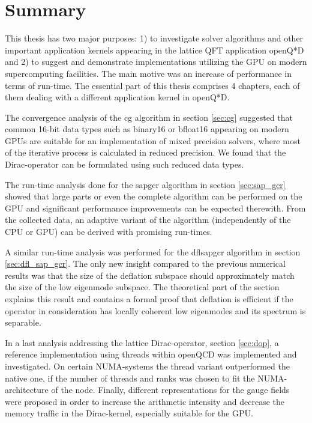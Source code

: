 \documentclass{article}
\theoremstyle{plain} %
\theoremstyle{convention} %
\theoremstyle{remark} %
\numberwithin{equation}{section}
\begin{document}
\section{Summary}

\label{sec:summary}

This thesis has two major purposes: 1) to investigate solver algorithms and other important application kernels appearing in the lattice QFT application openQ*D and 2) to suggest and demonstrate implementations utilizing the GPU on modern supercomputing facilities. The main motive was an increase of performance in terms of run-time. The essential part of this thesis comprises \num{4} chapters, each of them dealing with a different application kernel in openQ*D.

The convergence analysis of the \acrshort{cg} algorithm in section \ref{sec:cg} suggested that common \num{16}-bit data types such as \gls{binary16} or \gls{bfloat16} appearing on modern GPUs are suitable for an implementation of mixed precision solvers, where most of the iterative process is calculated in reduced precision. We found that the Dirac-operator can be formulated using such reduced data types.

The run-time analysis done for the \acrshort{sapgcr} algorithm in section \ref{sec:sap_gcr} showed that large parts or even the complete algorithm can be performed on the GPU and significant performance improvements can be expected therewith. From the collected data, an adaptive variant of the algorithm (independently of the CPU or GPU) can be derived with promising run-times.

A similar run-time analysis was performed for the \acrshort{dflsapgcr} algorithm in section \ref{sec:dfl_sap_gcr}. The only new insight compared to the previous numerical results was that the size of the deflation subspace should approximately match the size of the low eigenmode subspace. The theoretical part of the section explains this result and contains a formal proof that deflation is efficient if the operator in consideration has locally coherent low eigenmodes and its spectrum is separable.

In a last analysis addressing the lattice Dirac-operator, section \ref{sec:dop}, a reference implementation using threads within openQCD was implemented and investigated. On certain NUMA-systems the thread variant outperformed the native one, if the number of threads and ranks was chosen to fit the NUMA-architecture of the node. Finally, different representations for the gauge fields were proposed in order to increase the arithmetic intensity and decrease the memory traffic in the Dirac-kernel, especially suitable for the GPU.
\end{document}

